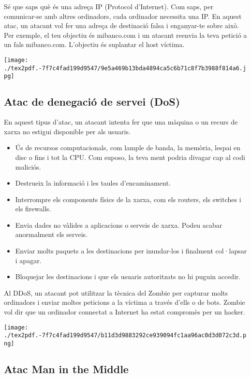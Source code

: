 \documentclass[]{article}
\begin{document}
Sé que saps què és una adreça IP (Protocol d'Internet). Com saps, per
comunicar-se amb altres ordinadors, cada ordinador necessita una IP. En
aquest atac, un atacant vol fer una adreça de destinació falsa i
enganyar-te sobre això. Per exemple, el teu objectiu és mibanco.com i un
atacant reenvia la teva petició a un fals mibanco.com. L'objectiu és
suplantar el host víctima.

\texttt{[image: ./tex2pdf.-7f7c4fad199d9547/9e5a469b13bda4894ca5c6b71c8f7b3988f814a6.jpg]}

\hypertarget{atac-de-denegaciuxf3-de-servei-dos}{%
\subsection{Atac de denegació de servei
(DoS)}\label{atac-de-denegaciuxf3-de-servei-dos}}

En aquest tipus d'atac, un atacant intenta fer que una màquina o un
recurs de xarxa no estigui disponible per als usuaris.

\begin{itemize}
\item
  Ús de recursos computacionals, com lample de banda, la memòria, lespai
  en disc o fins i tot la CPU. Com suposo, la teva ment podria divagar
  cap al codi maliciós.
\item
  Destrueix la informació i les taules d'encaminament.
\item
  Interrompre els components físics de la xarxa, com els routers, els
  switches i els firewalls.
\item
  Envia dades no vàlides a aplicacions o serveis de xarxa. Podeu acabar
  anormalment els serveis.
\item
  Enviar molts paquets a les destinacions per inundar-los i finalment
  col·lapsar i apagar.
\item
  Bloquejar les destinacions i que els usuaris autoritzats no hi puguin
  accedir.
\end{itemize}

Al DDoS, un atacant pot utilitzar la tècnica del Zombie per capturar
molts ordinadors i enviar moltes peticions a la víctima a través d'ells
o de bots. Zombie vol dir que un ordinador connectat a Internet ha estat
compromès per un hacker.

\texttt{[image: ./tex2pdf.-7f7c4fad199d9547/b11d3d9883292ce939094fc1aa96ac0d3d072c3d.png]}

\hypertarget{atac-man-in-the-middle}{%
\subsection{\texorpdfstring{\textbf{Atac Man in the
Middle}}{Atac Man in the Middle}}\label{atac-man-in-the-middle}}
\end{document}

